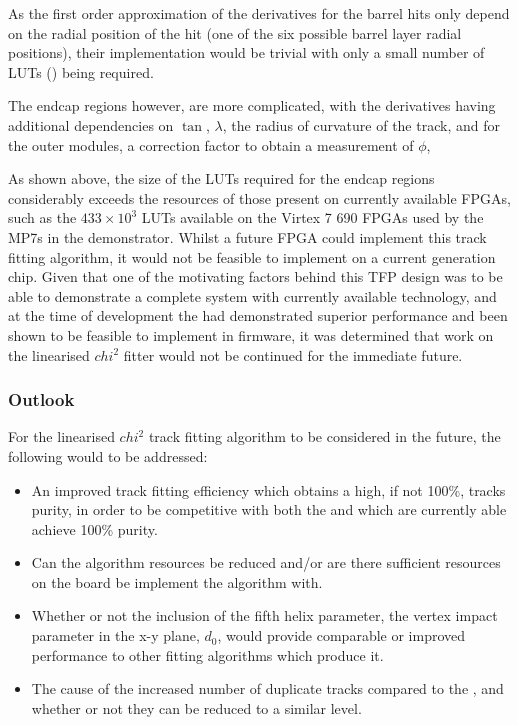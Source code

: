 As the first order approximation of the derivatives for the barrel hits only depend on the radial position of the hit (\ie one of the six possible barrel layer radial positions), their implementation would be trivial with only a small number of LUTs () being required.

The endcap regions however, are more complicated, with the derivatives having additional dependencies on $\tan$, $\lambda$, the radius of curvature of the track, and for the outer modules, a correction factor to obtain a measurement of $\phi$, 


As shown above, the size of the LUTs required for the endcap regions considerably exceeds the resources of those present on currently available FPGAs, such as the $433 \times 10^{3}$ LUTs available on the Virtex 7 690 FPGAs used by the MP7s in the demonstrator.
Whilst a future FPGA could implement this track fitting algorithm, it would not be feasible to implement on a current generation chip.
Given that one of the motivating factors behind this TFP design was to be able to demonstrate a complete system with currently available technology, and at the time of development the \KF had demonstrated superior performance and been shown to be feasible to implement in firmware, it was determined that work on the linearised $chi^{2}$ fitter would not be continued for the immediate future.



\subsubsection{Outlook}\label{subsubsec:chi2outlook}
For the linearised $chi^{2}$ track fitting algorithm to be considered in the future, the following would to be addressed:
\begin{itemize}
\item An improved track fitting efficiency which obtains a high, if not 100\%, tracks purity, in order to be competitive with both the \KF and \LR which are currently able achieve 100\% purity.
\item Can the algorithm resources be reduced and/or are there sufficient resources on the board be implement the algorithm with.
\item Whether or not the inclusion of the fifth helix parameter, the vertex impact parameter in the x-y plane, $d_{0}$, would provide comparable or improved performance to other fitting algorithms which produce it.
\item The cause of the increased number of duplicate tracks compared to the \KF, and whether or not they can be reduced to a similar level.
\end{itemize}

